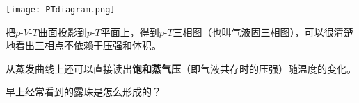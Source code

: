 \documentclass[CJK]{beamer}
\begin{document}
\begin{frame}
\bch
{}
\texttt{[image: PTdiagram.png]}
\emini
{}
{\small
把$p$-$V$-$T$曲面投影到$p$-$T$平面上，得到$p$-$T$三相图（也叫气液固三相图），可以很清楚地看出三相点不依赖于压强和体积。

从蒸发曲线上还可以直接读出{\bf 饱和蒸气压}（即气液共存时的压强）随温度的变化。}
\emini
\ech
\end{frame}

\begin{frame}
\bch
{}

早上经常看到的露珠是怎么形成的？
\ech
\end{frame}
\end{document}
